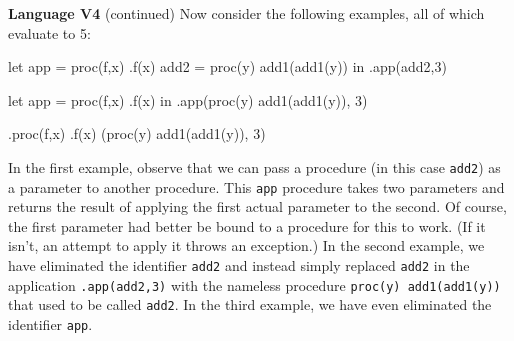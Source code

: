 \begin{minipage}[t]{\sw}
\slidenumber
\LARGE
{\bf Language V4} (continued)\exx
Now consider the following examples, all of which evaluate to 5:
\large
\begin{qv}
let
  app = proc(f,x) .f(x)
  add2 = proc(y) add1(add1(y))
in
  .app(add2,3)

let
  app = proc(f,x) .f(x)
in
  .app(proc(y) add1(add1(y)), 3)

.proc(f,x) .f(x) (proc(y) add1(add1(y)), 3)
\end{qv}
\LARGE
In the first example,
observe that we can pass a procedure (in this case \verb'add2')
as a parameter to another procedure.
This \verb'app' procedure takes two parameters
and returns the result of applying the first actual parameter
to the second.
Of course, the first parameter had better be bound to a procedure
for this to work.
(If it isn't, an attempt to apply it throws an exception.)\exx
In the second example,
we have eliminated the identifier \verb'add2'
and instead simply replaced \verb'add2' in the application \verb'.app(add2,3)'
with the nameless procedure \verb'proc(y) add1(add1(y))'
that used to be called \verb'add2'.\exx
In the third example,
we have even eliminated the identifier \verb'app'.
\end{minipage}
\clearpage
